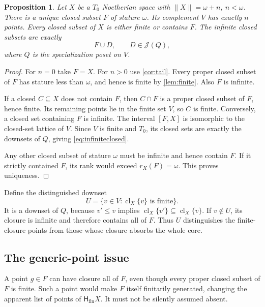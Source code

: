 \documentclass[11pt,a4paper]{article}
\newtheorem{proposition}[proposition]{Proposition}
\theoremstyle{definition}
\newcommand{\Hfin}{\mathsf H_{\mathrm{fin}}}
\newcommand{\JJ}{\mathcal J}
\newcommand{\st}[1]{\lVert #1\rVert}
\newcommand{\cl}{\operatorname{cl}}
\numberwithin{equation}{section}
\begin{document}
\begin{proposition}\label{prop:core}
Let $X$ be a $T_0$ Noetherian space with $\st X=\omega+n$, $n<\omega$.
There is a unique closed subset $F$ of stature $\omega$.  Its complement
$V$ has exactly $n$ points.  Every closed subset of $X$ is either finite
or contains $F$.  The infinite closed subsets are exactly
\begin{equation}\label{eq:infiniteclosed}
 F\cup D,\qquad D\in\JJ(Q),
\end{equation}
where $Q$ is the specialization poset on $V$.
\end{proposition}
\begin{proof}
For $n=0$ take $F=X$.  For $n>0$ use \cref{cor:tail}.  Every proper
closed subset of $F$ has stature less than $\omega$, and hence is finite
by \cref{lem:finite}.  Also $F$ is infinite.

If a closed $C\subseteq X$ does not contain $F$, then $C\cap F$ is a
proper closed subset of $F$, hence finite.  Its remaining points lie
in the finite set $V$, so $C$ is finite.  Conversely, a closed set
containing $F$ is infinite.  The interval $[F,X]$ is isomorphic to the
closed-set lattice of $V$.  Since $V$ is finite and $T_0$, its closed
sets are exactly the downsets of $Q$, giving \eqref{eq:infiniteclosed}.

Any other closed subset of stature $\omega$ must be infinite and hence
contain $F$.  If it strictly contained $F$, its rank would exceed
$r_X(F)=\omega$.  This proves uniqueness.
\end{proof}

Define the distinguished downset
\begin{equation}\label{eq:U}
 U=\{v\in V:\cl_X\{v\}\text{ is finite}\}.
\end{equation}
It is a downset of $Q$, because $v'\leq v$ implies
$\cl_X\{v'\}\subseteq\cl_X\{v\}$.  If $v\notin U$, its closure is
infinite and therefore contains all of $F$.  Thus $U$ distinguishes the
finite-closure points from those whose closure absorbs the whole core.

\subsection{The generic-point issue}

A point $g\in F$ can have closure all of $F$, even though every proper
closed subset of $F$ is finite.  Such a point would make $F$ itself
finitarily generated, changing the apparent list of points of $\Hfin X$.
It must not be silently assumed absent.
\end{document}
